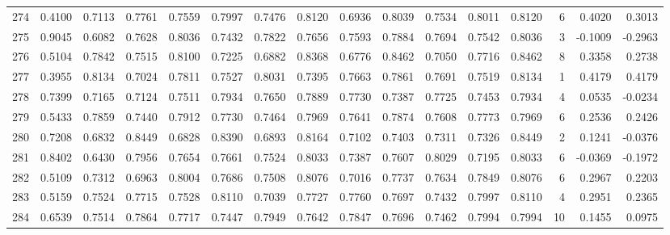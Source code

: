 \begin{tabular}{lrrrrrrrrrrrrrrr}
274 &      0.4100 &  0.7113 &  0.7761 &  0.7559 &  0.7997 &  0.7476 &  0.8120 &  0.6936 &  0.8039 &  0.7534 &   0.8011 &     0.8120 &      6 &                    0.4020 &                     0.3013 \\
275 &      0.9045 &  0.6082 &  0.7628 &  0.8036 &  0.7432 &  0.7822 &  0.7656 &  0.7593 &  0.7884 &  0.7694 &   0.7542 &     0.8036 &      3 &                   -0.1009 &                    -0.2963 \\
276 &      0.5104 &  0.7842 &  0.7515 &  0.8100 &  0.7225 &  0.6882 &  0.8368 &  0.6776 &  0.8462 &  0.7050 &   0.7716 &     0.8462 &      8 &                    0.3358 &                     0.2738 \\
277 &      0.3955 &  0.8134 &  0.7024 &  0.7811 &  0.7527 &  0.8031 &  0.7395 &  0.7663 &  0.7861 &  0.7691 &   0.7519 &     0.8134 &      1 &                    0.4179 &                     0.4179 \\
278 &      0.7399 &  0.7165 &  0.7124 &  0.7511 &  0.7934 &  0.7650 &  0.7889 &  0.7730 &  0.7387 &  0.7725 &   0.7453 &     0.7934 &      4 &                    0.0535 &                    -0.0234 \\
279 &      0.5433 &  0.7859 &  0.7440 &  0.7912 &  0.7730 &  0.7464 &  0.7969 &  0.7641 &  0.7874 &  0.7608 &   0.7773 &     0.7969 &      6 &                    0.2536 &                     0.2426 \\
280 &      0.7208 &  0.6832 &  0.8449 &  0.6828 &  0.8390 &  0.6893 &  0.8164 &  0.7102 &  0.7403 &  0.7311 &   0.7326 &     0.8449 &      2 &                    0.1241 &                    -0.0376 \\
281 &      0.8402 &  0.6430 &  0.7956 &  0.7654 &  0.7661 &  0.7524 &  0.8033 &  0.7387 &  0.7607 &  0.8029 &   0.7195 &     0.8033 &      6 &                   -0.0369 &                    -0.1972 \\
282 &      0.5109 &  0.7312 &  0.6963 &  0.8004 &  0.7686 &  0.7508 &  0.8076 &  0.7016 &  0.7737 &  0.7634 &   0.7849 &     0.8076 &      6 &                    0.2967 &                     0.2203 \\
283 &      0.5159 &  0.7524 &  0.7715 &  0.7528 &  0.8110 &  0.7039 &  0.7727 &  0.7760 &  0.7697 &  0.7432 &   0.7997 &     0.8110 &      4 &                    0.2951 &                     0.2365 \\
284 &      0.6539 &  0.7514 &  0.7864 &  0.7717 &  0.7447 &  0.7949 &  0.7642 &  0.7847 &  0.7696 &  0.7462 &   0.7994 &     0.7994 &     10 &                    0.1455 &                     0.0975 \\

\end{tabular}
